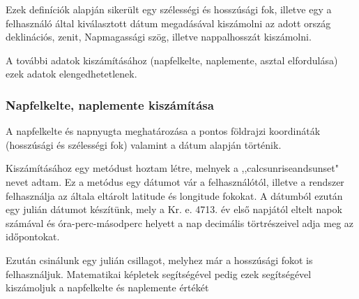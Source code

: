 \documentclass[
]{thesis-ekf}
\theoremstyle{definition}
\theoremstyle{remark}
\begin{document}
			\par Ezek definíciók alapján sikerült egy szélességi és hosszúsági fok, illetve egy a felhasználó által kiválasztott dátum megadásával kiszámolni az adott ország deklinációs, zenit, Napmagassági szög, illetve nappalhosszát kiszámolni.
			\par A további adatok kiszámításához (napfelkelte, naplemente, asztal elfordulása) ezek adatok elengedhetetlenek.
			\subsubsection{Napfelkelte, naplemente kiszámítása}
				\par A napfelkelte és napnyugta meghatározása a pontos földrajzi koordináták (hosszúsági és szélességi fok) valamint a dátum alapján történik.\cite{kiszamolo}
				\par Kiszámításához egy metódust hoztam létre, melnyek a  ,,calcsunriseandsunset" nevet adtam. Ez a metódus egy dátumot vár a felhasználótól, illetve a rendszer felhasználja az általa eltárolt latitude és longitude fokokat. A dátumból ezután egy julián dátumot készítünk, mely a Kr. e. 4713. év első napjától eltelt napok számával és óra-perc-másodperc helyett a nap decimális törtrészeivel adja meg az időpontokat.\cite{julian}
				\par Ezután csinálunk egy julián csillagot, melyhez már a hosszúsági fokot is felhasználjuk. Matematikai képletek segítségével pedig ezek segítségével kiszámoljuk a napfelkelte és naplemente értékét

				
\end{document}
